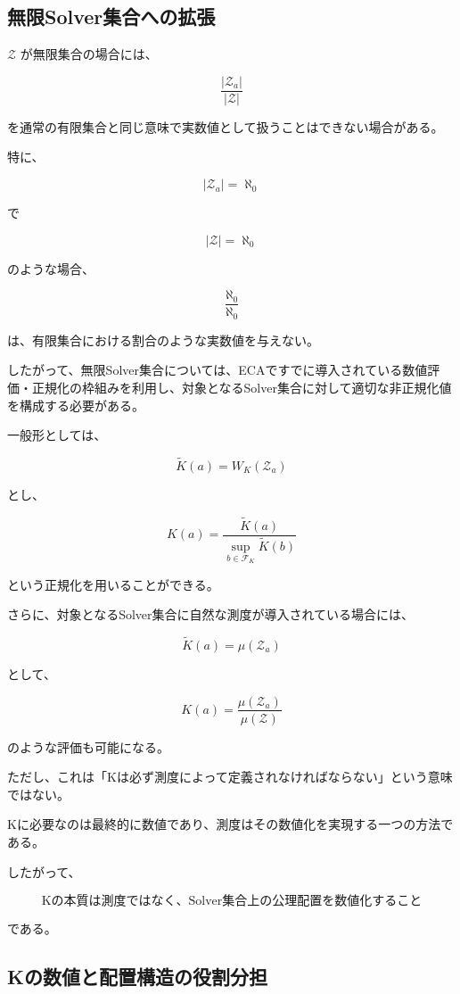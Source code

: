\subsection{無限Solver集合への拡張}

$\mathcal{Z}$ が無限集合の場合には、

\[
\frac{|\mathcal{Z}_a|}{|\mathcal{Z}|}
\]

を通常の有限集合と同じ意味で実数値として扱うことはできない場合がある。

特に、

\[
|\mathcal{Z}_a| = \aleph_0
\]

で

\[
|\mathcal{Z}| = \aleph_0
\]

のような場合、

\[
\frac{\aleph_0}{\aleph_0}
\]

は、有限集合における割合のような実数値を与えない。

したがって、無限Solver集合については、ECAですでに導入されている数値評価・正規化の枠組みを利用し、対象となるSolver集合に対して適切な非正規化値を構成する必要がある。

一般形としては、

\[
\widetilde{K}(a) = W_K(\mathcal{Z}_a)
\]

とし、

\[
K(a) = \frac{\widetilde{K}(a)}{\sup_{b\in\mathcal{F}_K}\widetilde{K}(b)}
\]

という正規化を用いることができる。

さらに、対象となるSolver集合に自然な測度が導入されている場合には、

\[
\widetilde{K}(a)=\mu(\mathcal{Z}_a)
\]

として、

\[
K(a) = \frac{\mu(\mathcal{Z}_a)}{\mu(\mathcal{Z})}
\]

のような評価も可能になる。

ただし、これは「Kは必ず測度によって定義されなければならない」という意味ではない。

Kに必要なのは最終的に数値であり、測度はその数値化を実現する一つの方法である。

したがって、

\[
\boxed{
\text{Kの本質は測度ではなく、Solver集合上の公理配置を数値化すること}
}
\]

である。

\subsection{Kの数値と配置構造の役割分担}

